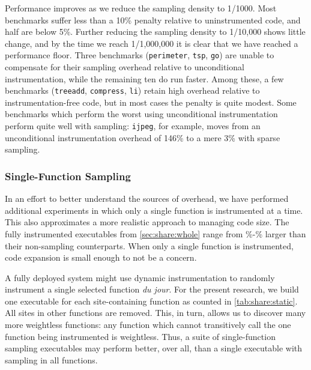 Performance improves as we reduce the sampling density to 1/1000.
Most benchmarks suffer less than a 10\% penalty relative to
uninstrumented code, and half are below 5\%.  Further reducing the
sampling density to 1/10,000 shows little change, and by the time we
reach 1/1,000,000 it is clear that we have reached a performance
floor.  Three benchmarks (\texttt{perimeter}, \texttt{tsp},
\texttt{go}) are unable to compensate for their sampling overhead
relative to unconditional instrumentation, while the remaining ten do
run faster.  Among these, a few benchmarks (\texttt{treeadd},
\texttt{compress}, \texttt{li}) retain high overhead relative to
instrumentation-free code, but in most cases the penalty is quite
modest.  Some benchmarks which perform the worst using unconditional
instrumentation perform quite well with sampling: \texttt{ijpeg}, for
example, moves from an unconditional instrumentation overhead of 146\%
to a mere 3\% with sparse sampling.

\subsubsection{Single-Function Sampling}



In an effort to better understand the sources of overhead, we have
performed additional experiments in which only a single function is
instrumented at a time.  This also approximates a more realistic
approach to managing code size.  The fully instrumented executables
from \autoref{sec:share:whole} range from
\execGrowthMin\%-\execGrowthMax\% larger than their non-sampling
counterparts.  When only a single function is instrumented, code
expansion is small enough to not be a concern.

A fully deployed system might use dynamic instrumentation to randomly
instrument a single selected function \textit{du jour}.  For the
present research, we build one executable for each site-containing
function as counted in \autoref{tab:share:static}.  All sites in other
functions are removed.  This, in turn, allows us to discover many more
weightless functions: any function which cannot transitively call the
one function being instrumented is weightless.  Thus, a suite of
single-function sampling executables may perform better, over all,
than a single executable with sampling in all functions.

